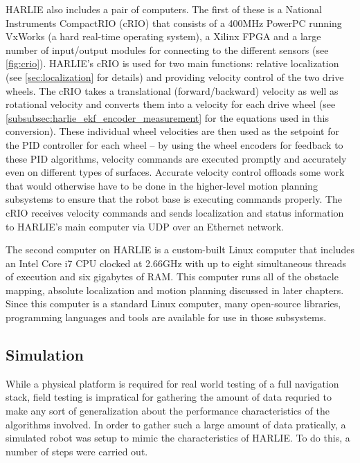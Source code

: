 HARLIE also includes a pair of computers. The first of these is a National Instruments CompactRIO (cRIO) that consists of a 400MHz PowerPC running VxWorks (a hard real-time operating system), a Xilinx FPGA and a large number of input/output modules for connecting to the different sensors \autocite{NIcRIO9074} (see \autoref{fig:crio}). HARLIE's cRIO is used for two main functions: relative localization (see \autoref{sec:localization} for details) and providing velocity control of the two drive wheels. The cRIO takes a translational (forward/backward) velocity as well as rotational velocity and converts them into a velocity for each drive wheel (see \autoref{subsubsec:harlie_ekf_encoder_measurement} for the equations used in this conversion). These individual wheel velocities are then used as the setpoint for the PID controller \autocite{PIDControllerWiki} for each wheel -- by using the wheel encoders for feedback to these PID algorithms, velocity commands are executed promptly and accurately even on different types of surfaces. Accurate velocity control offloads some work that would otherwise have to be done in the higher-level motion planning subsystems to ensure that the robot base is executing commands properly. The cRIO receives velocity commands and sends localization and status information to HARLIE's main computer via UDP over an Ethernet network.

The second computer on HARLIE is a custom-built Linux computer that includes an Intel Core i7 CPU clocked at 2.66GHz with up to eight simultaneous threads of execution and six gigabytes of RAM. This computer runs all of the obstacle mapping, absolute localization and motion planning discussed in later chapters. Since this computer is a standard Linux computer, many open-source libraries, programming languages and tools are available for use in those subsystems.

\subsection{Simulation}\label{subsec:simulation_setup}

While a physical platform is required for real world testing of a full navigation stack, field testing is impratical for gathering the amount of data requried to make any sort of generalization about the performance characteristics of the algorithms involved. In order to gather such a large amount of data pratically, a simulated robot was setup to mimic the characteristics of HARLIE. To do this, a number of steps were carried out.

